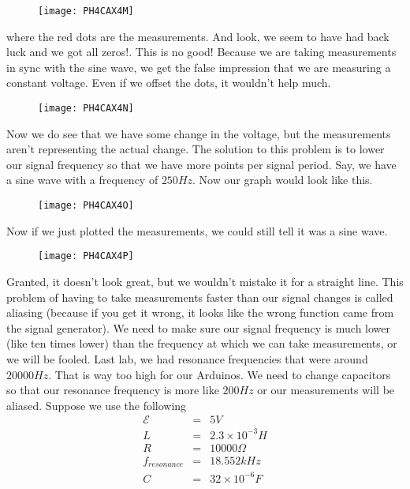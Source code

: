 \begin{figure}[h!]
	\centering
	\texttt{[image: PH4CAX4M]}
\end{figure}

where the red dots are the measurements. And look, we seem to have had back luck and we got all zeros!. This is no good! Because we are taking
measurements in sync with the sine wave, we get the false impression that we are measuring a constant voltage. Even if we offset the dots, it wouldn't help much.
\begin{figure}[h!]
	\centering
	\texttt{[image: PH4CAX4N]}
\end{figure}
Now we do see that we have some change in the voltage, but the measurements aren't representing the actual change. The solution to this problem is to lower our signal frequency so that we have more points per signal period. Say, we have a sine wave with a frequency of $250\unit{Hz}.$ Now our graph would look like this. 
\begin{figure}[h!]
	\centering
	\texttt{[image: PH4CAX4O]}
\end{figure}

Now if we just plotted the measurements, we could still tell it was a sine
wave.
\begin{figure}[h!]
	\centering
	\texttt{[image: PH4CAX4P]}
\end{figure}
Granted, it doesn't look great, but we wouldn't mistake it for a straight line. This problem of having to take measurements faster than our signal changes is called aliasing (because if you get it wrong, it looks like the wrong function came from the signal generator). We need to make sure our signal frequency is much lower (like ten times lower) than the frequency at which we can take measurements, or we will be fooled. Last lab, we had resonance frequencies that were around $20000\unit{Hz}.$ That is way too high for our Arduinos. We need to change capacitors so that our resonance frequency is more like $200\unit{Hz}$ or our measurements will be aliased. Suppose we use the following 
\begin{eqnarray*}
	\mathcal{E} &=&5\unit{V} \\
	          L &=&2.3\times 10^{-3}\unit{H} \\
	          R &=&10000\unit{\Omega} \\
  f_{resonance} &=&18.552\unit{kHz} \\
              C &=&32\times 10^{-6}\unit{F}
\end{eqnarray*}

